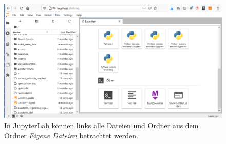 \documentclass{tufte-handout}
\begin{document}
\begin{figure}[h]
  \includegraphics{jupyterlab-running}
  \caption{In JupyterLab können links alle Dateien und Ordner aus dem Ordner \emph{Eigene Dateien} betrachtet werden.}%
\label{fig:start-jupyterlab}
\end{figure}

\doclicenseThis{}
\end{document}
